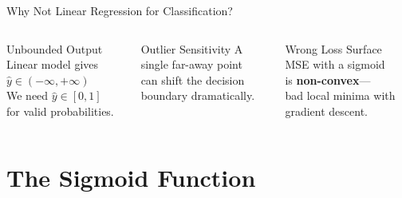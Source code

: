 \documentclass[aspectratio=169,11pt]{beamer}
\begin{document}
\begin{frame}{Why Not Linear Regression for Classification?}
\begin{columns}[T]
\begin{alertblock}{Unbounded Output}
Linear model gives\\
$\hat{y}\in(-\infty,+\infty)$\\[0.3em]
We need $\hat{y}\in[0,1]$\\
for valid probabilities.
\end{alertblock}

\begin{alertblock}{Outlier Sensitivity}
A single far-away point\\
can shift the decision\\
boundary dramatically.
\end{alertblock}

\begin{alertblock}{Wrong Loss Surface}
MSE with a sigmoid\\
is \textbf{non-convex}---\\
bad local minima with\\
gradient descent.
\end{alertblock}
\end{columns}

\vspace{1em}
\begin{center}
\end{center}
\end{frame}

\section{The Sigmoid Function}
\end{document}
